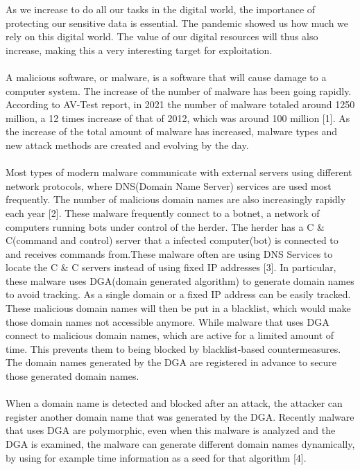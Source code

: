 As we increase to do all our tasks in the digital world, the importance of
protecting our sensitive data is essential. The pandemic showed us how much
we rely on this digital world. The value of our digital resources will thus
also increase, making this a very interesting target for exploitation. \\\\
A malicious software, or malware, is a software that will cause damage to a
computer system. The increase of the number of malware has been going rapidly.
According to AV-Test report, in 2021 the number of malware totaled around 1250
million, a 12 times increase of that of 2012, which was around 100 million [1].
As the increase of the total amount of malware has increased, malware types and
new attack methods are created and evolving by the day.\\\\
Most types of modern malware communicate with external servers using different network protocols, where DNS(Domain Name Server) services are used most frequently. The number of malicious domain names are also increasingly rapidly each year [2]. These malware frequently connect to a botnet, a network of computers
running bots under control of the herder. The herder has a C \& C(command and control) server that a infected computer(bot) is connected to and receives commands from.These malware often are using DNS Services to locate the C \& C servers instead
of using fixed IP addresses [3]. In particular, these malware uses DGA(domain generated algorithm) to generate domain names to avoid tracking. As a single domain or a fixed IP address can be easily tracked. These malicious domain names will then be put in a blacklist, which would make those domain names not accessible anymore. While malware that uses DGA connect to malicious domain names, which are active for a limited amount of time. This prevents them to being blocked by blacklist-based countermeasures. The domain names generated by the DGA are registered in advance
to secure those generated domain names.\\\\
When a domain name is detected and blocked after an attack, the attacker can register another domain name that was generated by the DGA. Recently malware that uses DGA are polymorphic, even when this malware is analyzed and the DGA is examined, the malware can generate different domain names dynamically, by using for example time information as a seed for that algorithm [4].\\\\
